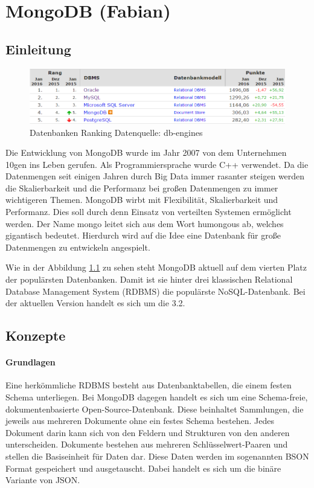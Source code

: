 \chapter{MongoDB (Fabian)}\label{mongodb-fabian}

\section{Einleitung}\label{einleitung}

\begin{figure}[h]
	\centering
	\includegraphics[width=0.7\linewidth]{figures/db-ranking.png}
	\caption{Datenbanken Ranking Datenquelle: db-engines \cite{db-engines:mongodb}}
	\label{f:mongodb:ranking}
\end{figure}

Die Entwicklung von MongoDB wurde im Jahr 2007 von dem Unternehmen 10gen
ins Leben gerufen. Als Programmiersprache wurde C++ verwendet.
Da die Datenmengen seit einigen Jahren durch Big Data immer rasanter steigen \cite{csc:bigdata}
werden die Skalierbarkeit und die Performanz bei großen Datenmengen zu
immer wichtigeren Themen. MongoDB wirbt mit Flexibilität, Skalierbarkeit und
Performanz. Dies soll durch denn Einsatz von verteilten Systemen
ermöglicht werden. Der Name mongo leitet sich aus dem Wort humongous ab,
welches gigantisch bedeutet. Hierdurch wird auf die Idee eine Datenbank
für große Datenmengen zu entwickeln angespielt.

Wie in der Abbildung \ref{f:mongodb:ranking} zu sehen steht MongoDB aktuell auf dem
vierten Platz der populärsten Datenbanken. Damit ist sie hinter drei
klassischen Relational Database Management System (RDBMS) die populärste
NoSQL-Datenbank. Bei der aktuellen Version handelt es sich um die 3.2.

\section{Konzepte}\label{konzepte}

\subsubsection{Grundlagen}
Eine herkömmliche RDBMS besteht aus Datenbanktabellen, die einem festen
Schema unterliegen. Bei MongoDB dagegen handelt es sich um eine
Schema-freie, dokumentenbasierte Open-Source-Datenbank. Diese beinhaltet
Sammlungen, die jeweils aus mehreren Dokumente ohne ein festes Schema
bestehen. Jedes Dokument darin kann sich von den Feldern und Strukturen
von den anderen unterscheiden. Dokumente bestehen aus mehreren
Schlüsselwert-Paaren und stellen die Basiseinheit für Daten dar.
Diese Daten werden im sogenannten BSON Format gespeichert und
ausgetauscht. Dabei handelt es sich um die binäre Variante von JSON.

